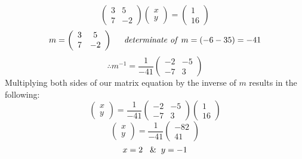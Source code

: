 \documentclass{article}
\begin{document}
                \[\left(\begin{array}{cc} 3 & 5 \\ 7 & -2 \end{array}\right)\left(\begin{array}{c} x \\ y \end{array}\right)=\left(\begin{array}{c} 1 \\ 16 \end{array}\right)\]
                \[m=\left(\begin{array}{cc} 3 & 5 \\ 7 & -2 \end{array}\right) \hspace{0.5cm} \text{\textit{determinate of} } m=\left(-6-35\right)=-41\]
                \[ \therefore m^{-1} = \frac{1}{-41} \left(\begin{array}{cc} -2 & -5 \\ -7 & 3 \end{array}\right)\]
                Multiplying both sides of our matrix equation by the inverse of \(m\) results in the following:
                \[\left(\begin{array}{c} x \\ y \end{array}\right) = \frac{1}{-41} \left(\begin{array}{cc} -2 & -5 \\ -7 & 3 \end{array}\right) \left(\begin{array}{c} 1 \\ 16 \end{array}\right)\]
                \[\left(\begin{array}{c} x \\ y \end{array}\right) = \frac{1}{-41} \left(\begin{array}{c} -82 \\ 41 \end{array}\right)\]
                \[x=2 \hspace{0.3cm} \& \hspace{0.2cm} y=-1\]
\end{document}

